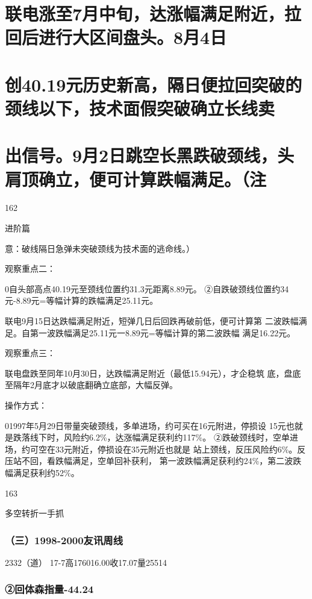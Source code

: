 \documentclass{article}
\begin{document}
\section{联电涨至7月中旬，达涨幅满足附近，拉回后进行大区间盘头。8月4日}

\section{创40.19元历史新高，隔日便拉回突破的颈线以下，技术面假突破确立长线卖}

\section{出信号。9月2日跳空长黑跌破颈线，头肩顶确立，便可计算跌幅满足。（注}

162

\clearpage

进阶篇

意：破线隔日急弹未突破颈线为技术面的逃命线。）

观察重点二：

0自头部高点40.19元至颈线位置约31.3元距离8.89元。 ②自跌破颈线位置约34元-8.89元=等幅计算的跌幅满足25.11元。

联电9月15日达跌幅满足附近，短弹几日后回跌再破前低，便可计算第 二波跌幅满足。自第一波跌幅满足25.11元一8.89元=等幅计算的第二波跌幅 满足16.22元。

观察重点三：

联电盘跌至同年10月30日，达跌幅满足附近（最低15.94元），才企稳筑 底，盘底至隔年2月底才以破底翻确立底部，大幅反弹。

操作方式：

01997年5月29日带量突破颈线，多单进场，约可买在16元附进，停损设 15元也就是跌落线下时，风险约6.2\%，达涨幅满足获利约117\%。 ②跌破颈线时，空单进场，约可空在33元附近，停损设在35元附近也就是 站上颈线，反压风险约6\%。反压站不回，看跌幅满足，空单回补获利， 第一波跌幅满足获利约24\%，第二波跌幅满足获利约52\%。

163

\clearpage

多空转折一手抓

\subsubsection{（三）1998-2000友讯周线}

2332（道） 17-7高176016.00收17.07量25514

\subsubsection{②回体森指量-44.24}
\end{document}
